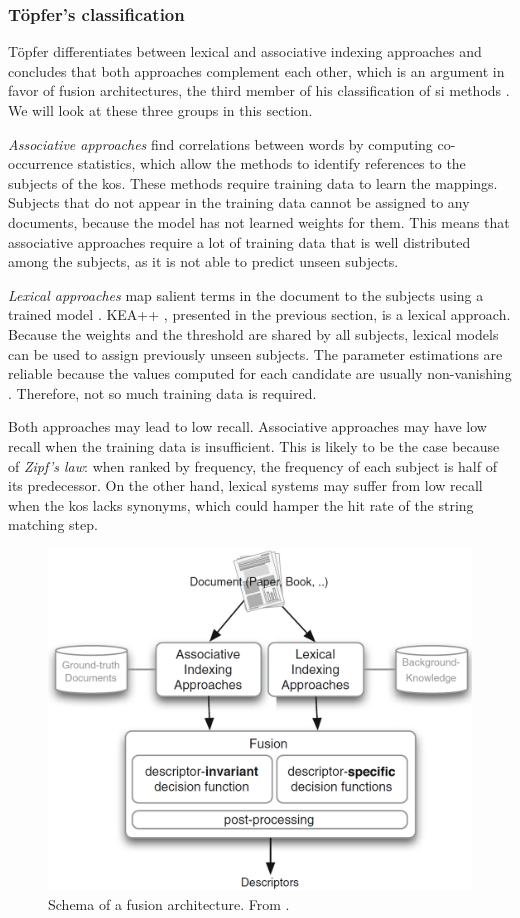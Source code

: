 \subsubsection{Töpfer's classification} \label{subject_indexing_toepfer}

Töpfer differentiates between lexical and associative indexing approaches and concludes that both approaches complement each other, which is an argument in favor of fusion architectures, the third member of his classification of \acrshort{si} methods \cite{toepfer2020fusion}. We will look at these three groups in this section.

\textit{Associative approaches} find correlations between words \cite{suominen2019annif} by computing co-occurrence statistics, which allow the methods to identify references to the subjects of the \acrshort{kos}. These methods require training data to learn the mappings. Subjects that do not appear in the training data cannot be assigned to any documents, because the model has not learned weights for them. This means that associative approaches require a lot of training data that is well distributed among the subjects, as it is not able to predict unseen subjects.

\textit{Lexical approaches} map salient terms in the document to the subjects using a trained model \cite{suominen2019annif}. KEA++ \cite{medelyan2008domain}, presented in the previous section, is a lexical approach. Because the weights and the threshold are shared by all subjects, lexical models can be used to assign previously unseen subjects. The parameter estimations are reliable because the values computed for each candidate are usually non-vanishing \cite{toepfer2020fusion}. Therefore, not so much training data is required.

Both approaches may lead to low recall. Associative approaches may have low recall when the training data is insufficient. This is likely to be the case because of \textit{Zipf's law}: when ranked by frequency, the frequency of each subject is half of its predecessor. On the other hand, lexical systems may suffer from low recall when the \acrshort{kos} lacks synonyms, which could hamper the hit rate of the string matching step.

\begin{figure}
    \centering
    \includegraphics[width=.5\textwidth]{figures/related_work/fusion_architecture.PNG}
    \caption{Schema of a fusion architecture. From \cite{toepfer2020fusion}.}
    \label{fig:fusion_architecture}
\end{figure}

